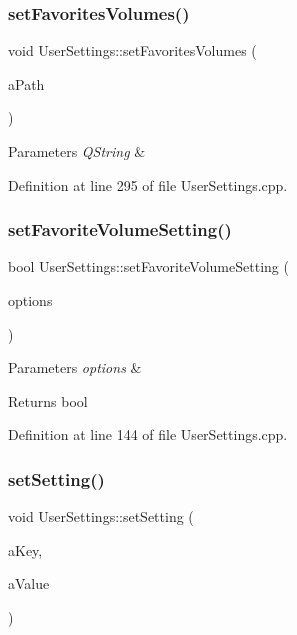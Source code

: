 \subsubsection{\texorpdfstring{set\+Favorites\+Volumes()}{setFavoritesVolumes()}}
{\footnotesize\ttfamily void User\+Settings\+::set\+Favorites\+Volumes (\begin{DoxyParamCaption}\item[{Q\+String}]{a\+Path }\end{DoxyParamCaption})}


\begin{DoxyParams}{Parameters}
{\em Q\+String} & \\
\hline
\end{DoxyParams}


Definition at line 295 of file User\+Settings.\+cpp.

\mbox{\label{class_user_settings_a622a1a050f24e29663b8c1c8160f334c}} 
\subsubsection{\texorpdfstring{set\+Favorite\+Volume\+Setting()}{setFavoriteVolumeSetting()}}
{\footnotesize\ttfamily bool User\+Settings\+::set\+Favorite\+Volume\+Setting (\begin{DoxyParamCaption}\item[{Q\+Variant\+Map}]{options }\end{DoxyParamCaption})}


\begin{DoxyParams}{Parameters}
{\em options} & \\
\hline
\end{DoxyParams}
\begin{DoxyReturn}{Returns}
bool 
\end{DoxyReturn}


Definition at line 144 of file User\+Settings.\+cpp.

\mbox{\label{class_user_settings_aef31a9f5222e267a9577660105e6b256}} 
\subsubsection{\texorpdfstring{set\+Setting()}{setSetting()}}
{\footnotesize\ttfamily void User\+Settings\+::set\+Setting (\begin{DoxyParamCaption}\item[{const Q\+String \&}]{a\+Key,  }\item[{const Q\+String \&}]{a\+Value }\end{DoxyParamCaption})}



